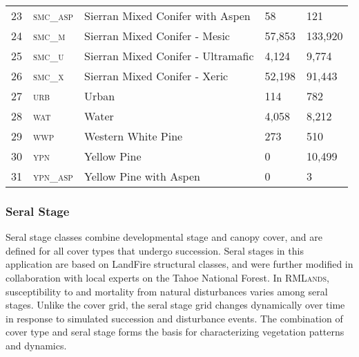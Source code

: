 \begin{table}[!htbp]
\begin{tabular}{@{}lllll@{}}
\rowcolor[HTML]{CAD6BA} 23   & \textsc{smc\_asp}     & Sierran Mixed Conifer with Aspen             & 58    		    & 121            \\
24                           & \textsc{smc\_m  }     & Sierran Mixed Conifer - Mesic                & 57,853 	      & 133,920        \\
\rowcolor[HTML]{CAD6BA} 25   & \textsc{smc\_u  }     & Sierran Mixed Conifer - Ultramafic           & 4,124  	      & 9,774          \\
26                           & \textsc{smc\_x  }     & Sierran Mixed Conifer - Xeric                & 52,198 	      & 91,443         \\
\rowcolor[HTML]{CAD6BA} 27   & \textsc{urb     }     & Urban                                        & 114   		    & 782            \\
28                           & \textsc{wat     }     & Water                                        & 4,058  	      & 8,212          \\
\rowcolor[HTML]{CAD6BA} 29   & \textsc{wwp     }     & Western White Pine                           & 273   		    & 510            \\
30                           & \textsc{ypn     }     & Yellow Pine                                  & 0     		    & 10,499         \\
\rowcolor[HTML]{CAD6BA} 31   & \textsc{ypn\_asp}     & Yellow Pine with Aspen                       & 0     		    & 3              \\ \bottomrule
\end{tabular}
\end{table}
\normalsize

\subsubsection{Seral Stage}
Seral stage classes combine developmental stage and canopy cover, and are defined for all cover types that undergo succession. Seral stages in this application are based on LandFire structural classes, and were further modified in collaboration with local experts on the Tahoe National Forest. In \textsc{RMLands}, susceptibility to and mortality from natural disturbances varies among seral stages. Unlike the cover grid, the seral stage grid changes dynamically over time in response to simulated succession and disturbance events. The combination of cover type and seral stage forms the basis for characterizing vegetation patterns and dynamics.

